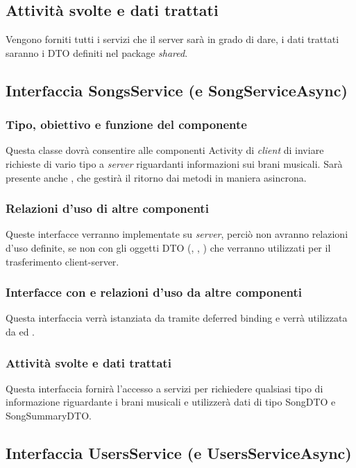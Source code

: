 \subsection*{Attivit\`a svolte e dati trattati}
Vengono forniti tutti i servizi che il server sar\`a in grado di dare, i dati
trattati saranno i DTO definiti nel package \emph{shared}.

\subsection{Interfaccia SongsService (e SongServiceAsync)}
\subsubsection*{Tipo, obiettivo e funzione del componente}
Questa classe dovr\`a consentire alle componenti Activity di \emph{client} di
inviare richieste di vario tipo a \emph{server} riguardanti informazioni sui
brani musicali. Sar\`a presente anche , che gestir\`a il ritorno
dai metodi in maniera asincrona.

\subsubsection*{Relazioni d'uso di altre componenti}
Queste interfacce verranno implementate su \emph{server}, perci\`o non
avranno relazioni d'uso definite, se non con gli oggetti DTO
(, , ) che verranno
utilizzati per il trasferimento client-server.

\subsubsection*{Interfacce con e relazioni d'uso da altre componenti}
Questa interfaccia verr\`a istanziata da  tramite deferred
binding e verr\`a utilizzata da  ed .

\subsubsection*{Attivit\`a svolte e dati trattati}
Questa interfaccia fornir\`a l'accesso a servizi per richiedere qualsiasi tipo
di informazione riguardante i brani musicali e utilizzer\`a dati di tipo SongDTO
e SongSummaryDTO.

\subsection{Interfaccia UsersService (e UsersServiceAsync)}
